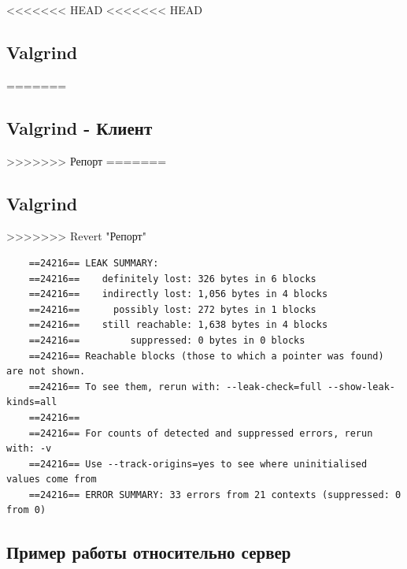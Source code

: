 \documentclass[a4paper,12pt]{report}
\begin{document}
<<<<<<< HEAD
<<<<<<< HEAD
\subsection{Valgrind}
=======
\subsection{Valgrind - Клиент}
>>>>>>> Репорт
=======
\subsection*{Valgrind}
>>>>>>> Revert "Репорт"

\begin{verbatim}
    ==24216== LEAK SUMMARY:
    ==24216==    definitely lost: 326 bytes in 6 blocks
    ==24216==    indirectly lost: 1,056 bytes in 4 blocks
    ==24216==      possibly lost: 272 bytes in 1 blocks
    ==24216==    still reachable: 1,638 bytes in 4 blocks
    ==24216==         suppressed: 0 bytes in 0 blocks
    ==24216== Reachable blocks (those to which a pointer was found) are not shown.
    ==24216== To see them, rerun with: --leak-check=full --show-leak-kinds=all
    ==24216== 
    ==24216== For counts of detected and suppressed errors, rerun with: -v
    ==24216== Use --track-origins=yes to see where uninitialised values come from
    ==24216== ERROR SUMMARY: 33 errors from 21 contexts (suppressed: 0 from 0)
\end{verbatim}

\subsection*{Пример работы относительно сервер}
\end{document}
